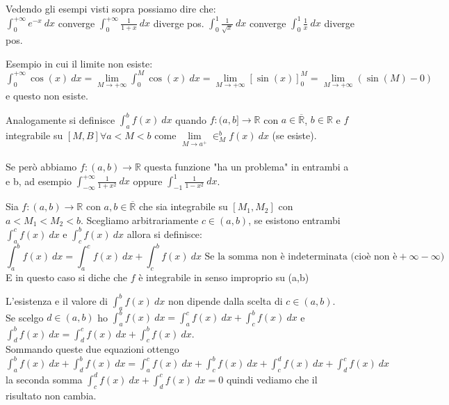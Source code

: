 \hspace{-15pt}Vedendo gli esempi visti sopra possiamo dire che:\\
$\int_0^{+\infty}e^{-x}\:dx$ converge \hfill $\int_0^{+\infty}\frac{1}{1+x}\:dx$ diverge pos. \hfill $\int_0^1 \frac{1}{\sqrt{x}}\:dx$ converge \hfill $\int_0^1\frac{1}{x}\:dx$ diverge pos.

\begin{example}
Esempio in cui il limite non esiste: $\int_0^{+\infty}\cos(x)\:dx = \lim\limits_{M\to +\infty}\int_0^M\cos(x)\:dx = \lim\limits_{M\to +\infty}[\sin(x)]_0^M = \lim\limits_{M\to +\infty}(\sin(M)-0)$ e questo non esiste.
\end{example}

\hspace{-15pt}Analogamente si definisce $\int_a^b f(x)\:dx$ quando $f:(a,b] \to \mathbb{R}$ con $a \in \mathbb{\overline{R}}$, $b\in \mathbb{R}$ e $f$ integrabile su $[M,B] \forall a < M < b$ come $\lim\limits_{M\to a^+}\in_M^b f(x) \:dx$ (se esiste).\\\\
Se però abbiamo $f:(a,b)\to \mathbb{R}$ questa funzione "ha un problema" in entrambi a e b, ad esempio $\int_{-\infty}^{+\infty}\frac{1}{1+x^2}\:dx$ oppure $\int_{-1}^1 \frac{1}{1-x^2}\:dx$.

\begin{definition}
Sia $f: (a,b)\to \mathbb{R}$ con $a,b \in \mathbb{\overline{R}}$ che sia integrabile su $[M_1,M_2]$ con $a<M_1<M_2<b$. Scegliamo arbitrariamente $c\in (a,b)$, se esistono entrambi $\int_a^c f(x)\:dx$ e $\int_c^b f(x)\:dx$ allora si definisce:
\[\int_a^b f(x)\:dx = \int_a^c f(x)\:dx + \int_c^b f(x)\:dx \text{ Se la somma non è indeterminata (cioè non è} +\infty-\infty)\]
E in questo caso si diche che $f$ è integrabile in senso improprio su (a,b)
\end{definition}

\begin{observation}
L'esistenza e il valore di $\int_a^b f(x) \:dx$ non dipende dalla scelta di $c\in (a,b)$.\\
Se scelgo $d\in (a,b)$ ho $\int_a^b f(x)\:dx = \int_a^c f(x)\:dx + \int_c^b f(x)\:dx$ e $\int_d^b f(x)\:dx = \int_d^c f(x)\:dx + \int_c^b f(x)\:dx$.\\
Sommando queste due equazioni ottengo $\int_a^b f(x)\:dx + \int_d^b f(x)\:dx = \int_a^c f(x)\:dx + \int_c^b f(x)\:dx + \int_c^d f(x)\:dx + \int_d^c f(x)\:dx$ la seconda somma $\int_c^d f(x)\:dx + \int_d^c f(x)\:dx = 0$ quindi vediamo che il risultato non cambia.
\end{observation}

